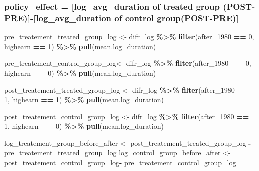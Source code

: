 \documentclass[
]{article}
\newenvironment{Shaded}{\begin{snugshade}}{\end{snugshade}}
\newcommand{\DecValTok}[1]{\textcolor[rgb]{0.00,0.00,0.81}{#1}}
\newcommand{\FunctionTok}[1]{\textcolor[rgb]{0.13,0.29,0.53}{\textbf{#1}}}
\newcommand{\NormalTok}[1]{#1}
\newcommand{\OtherTok}[1]{\textcolor[rgb]{0.56,0.35,0.01}{#1}}
\newcommand{\SpecialCharTok}[1]{\textcolor[rgb]{0.81,0.36,0.00}{\textbf{#1}}}
\begin{document}
\subsubsection{policy\_effect = {[}log\_avg\_duration of treated group
(POST-PRE){]}-{[}log\_avg\_duration of control
group(POST-PRE){]}}\label{policy_effect-log_avg_duration-of-treated-group-post-pre-log_avg_duration-of-control-grouppost-pre}

\begin{Shaded}
\begin{Highlighting}[]
\NormalTok{pre\_treatement\_treated\_group\_log }\OtherTok{\textless{}{-}}\NormalTok{ difr\_log }\SpecialCharTok{\%\textgreater{}\%} 
  \FunctionTok{filter}\NormalTok{(after\_1980 }\SpecialCharTok{==} \DecValTok{0}\NormalTok{, highearn }\SpecialCharTok{==} \DecValTok{1}\NormalTok{) }\SpecialCharTok{\%\textgreater{}\%} 
  \FunctionTok{pull}\NormalTok{(mean.log\_duration)}

\NormalTok{pre\_treatement\_control\_group\_log}\OtherTok{\textless{}{-}}\NormalTok{ difr\_log }\SpecialCharTok{\%\textgreater{}\%} 
  \FunctionTok{filter}\NormalTok{(after\_1980 }\SpecialCharTok{==} \DecValTok{0}\NormalTok{, highearn }\SpecialCharTok{==} \DecValTok{0}\NormalTok{) }\SpecialCharTok{\%\textgreater{}\%} 
  \FunctionTok{pull}\NormalTok{(mean.log\_duration)}

\NormalTok{post\_treatement\_treated\_group\_log }\OtherTok{\textless{}{-}}\NormalTok{ difr\_log }\SpecialCharTok{\%\textgreater{}\%} 
  \FunctionTok{filter}\NormalTok{(after\_1980 }\SpecialCharTok{==} \DecValTok{1}\NormalTok{, highearn }\SpecialCharTok{==} \DecValTok{1}\NormalTok{) }\SpecialCharTok{\%\textgreater{}\%} 
  \FunctionTok{pull}\NormalTok{(mean.log\_duration)}

\NormalTok{post\_treatement\_control\_group\_log }\OtherTok{\textless{}{-}}\NormalTok{ difr\_log }\SpecialCharTok{\%\textgreater{}\%} 
  \FunctionTok{filter}\NormalTok{(after\_1980 }\SpecialCharTok{==} \DecValTok{1}\NormalTok{, highearn }\SpecialCharTok{==} \DecValTok{0}\NormalTok{) }\SpecialCharTok{\%\textgreater{}\%} 
  \FunctionTok{pull}\NormalTok{(mean.log\_duration)}
\end{Highlighting}
\end{Shaded}

\begin{Shaded}
\begin{Highlighting}[]
\NormalTok{log\_treatement\_group\_before\_after }\OtherTok{\textless{}{-}}\NormalTok{ post\_treatement\_treated\_group\_log }\SpecialCharTok{{-}} 
\NormalTok{  pre\_treatement\_treated\_group\_log}
\NormalTok{log\_control\_group\_before\_after    }\OtherTok{\textless{}{-}}\NormalTok{post\_treatement\_control\_group\_log}\SpecialCharTok{{-}} 
\NormalTok{  pre\_treatement\_control\_group\_log}
\end{Highlighting}
\end{Shaded}
\end{document}
